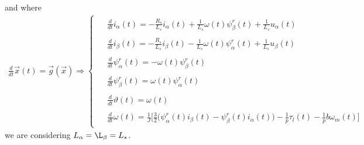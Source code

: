 \documentclass[11pt,a4paper]{scrartcl}
\numberwithin{equation}{section}
\theoremstyle{it}
\theoremstyle{definition}
\begin{document}
\begin{onehalfspace}
\begin{equation}
\end{equation} 
and where
\begin{align}\label{pmsm_problem_1_eq_8}
	\frac{d}{dt}\vec{x}(t)=\vec{g}(\vec{x})\Rightarrow\left\lbrace 
	\begin{aligned}
		\begin{split}
			&\frac{d}{dt}i_\alpha(t) = -\frac{R_s}{L_s}i_\alpha(t) + 	
			\frac{1}{L_s}\omega(t)\psi_\beta^r(t) + \frac{1}{L_s} u_\alpha(t) 
		\end{split}	\\[6pt]
		\begin{split}
			&\frac{d}{dt}i_\beta(t) = -\frac{R_s}{L_s}i_\beta(t) - 	
			\frac{1}{L_s}\omega(t)\psi_\alpha^r(t) + \frac{1}{L_s} u_\beta(t)	
		\end{split}	\\[6pt]
		\begin{split}
			&\frac{d}{dt}\psi_\alpha^r(t) = -\omega(t)\psi_\beta^r(t)
		\end{split}	\\[6pt]
		\begin{split}	
			&\frac{d}{dt}\psi_\beta^r(t) = \omega(t)\psi_\alpha^r(t)	
		\end{split}	\\[6pt]
		\begin{split}
			&\frac{d}{dt}\vartheta(t) = \omega(t)
		\end{split}	\\[6pt]
		\begin{split}
			&\frac{d}{dt}\omega(t) = 
			\frac{1}{J}\Bigg[\frac{3}{2}\Big(\psi^r_{\alpha}(t)i_{\beta}(t) - 
			\psi^r_{\beta}(t)i_{\alpha}(t)\Big)  -\frac{1}{p}\tau_l(t) 
			-\frac{1}{p}b\omega_m(t)\Bigg]
		\end{split}
	\end{aligned}\right. 
\end{align}
we are considering $L_\alpha = \L_\beta = L_s$.


\end{onehalfspace}
\end{document}
